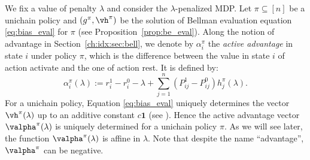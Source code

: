 We fix a value of penalty $\lambda$ and consider the $\lambda$-penalized MDP.
Let $\pi\subseteq[n]$ be a unichain policy and $(g^\pi, \vh^\pi)$ be the solution of Bellman evaluation equation \eqref{eq:bias_eval} for $\pi$ (see Proposition~\ref{prop:be_eval}).
Along the notion of advantage in Section~\ref{ch:idx:sec:bell}, we denote by $\alpha^{\pi}_i$ the \emph{active advantage} in state $i$ under policy $\pi$, which is the difference between the value in state $i$ of action activate and the one of action rest.
It is defined by:
\begin{equation}
    \label{eq:advantage}
    \alpha^\pi_i(\lambda):=r^1_i -r^0_i -\lambda +\sum_{j=1}^n (P^1_{ij} -P^0_{ij})h^\pi_j(\lambda).
\end{equation}
For a unichain policy, Equation \eqref{eq:bias_eval} uniquely determines the vector $\vh^\pi(\lambda)$ up to an additive constant $c\mathbf{1}$ (see \cite[Chapter 8]{puterman2014markov}).
Hence the active advantage vector $\valpha^\pi(\lambda)$ is uniquely determined for a unichain policy $\pi$.
As we will see later, the function $\valpha^\pi(\lambda)$ is affine in $\lambda$.
Note that despite the name ``advantage'', $\valpha^{\pi}$ can be negative.

